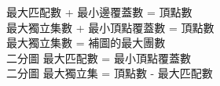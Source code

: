最大匹配數 + 最小邊覆蓋數 = 頂點數 \\
最大獨立集數 + 最小頂點覆蓋數 = 頂點數 \\
最大獨立集數 = 補圖的最大團數 \\
二分圖 最大匹配數 = 最小頂點覆蓋數 \\
二分圖 最大獨立集 = 頂點數 - 最大匹配數 
